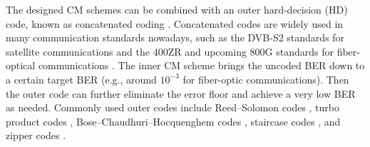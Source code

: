 \documentclass[journal]{IEEEtran}
\begin{document}
The designed CM schemes can be combined with an outer hard-decision (HD) code, known as concatenated coding \cite{forney1965concatenated,barakatain2020}. Concatenated codes are widely used in many communication standards nowadays, such as the DVB-S2 standards \cite{dvbs2} for satellite communications and the 400ZR \cite{400ZR} and upcoming 800G standards for fiber-optical communications \cite{stern21}. The inner CM scheme brings the uncoded BER down to a certain target BER (e.g., around $10^{-3}$ for fiber-optic communications). Then the outer code can further eliminate the error floor and achieve a very low BER as needed. Commonly used outer codes include Reed--Solomon codes \cite{wicker1999reed}, turbo product codes \cite{wang23}, Bose--Chaudhuri--Hocquenghem codes \cite{forney1965bch}, staircase codes \cite{smith2011staircase}, and zipper codes \cite{sukmadji2019zipper}.
\end{document}
